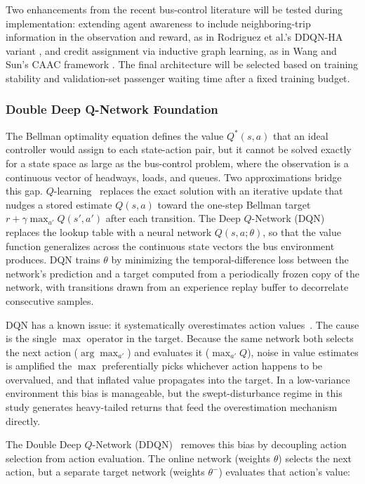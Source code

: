 Two enhancements from the recent bus-control literature will be tested during implementation: extending agent awareness to include neighboring-trip information in the observation and reward, as in Rodriguez et al.'s DDQN-HA variant \cite{Rodriguez2023Cooperative}, and credit assignment via inductive graph learning, as in Wang and Sun's CAAC framework \cite{Wangsun}. The final architecture will be selected based on training stability and validation-set passenger waiting time after a fixed training budget.


\subsubsection{Double Deep Q-Network Foundation}
\label{subsec:ddqn-foundation}

The Bellman optimality equation defines the value $Q^*(s,a)$ that an ideal controller would assign to each state-action pair, but it cannot be solved exactly for a state space as large as the bus-control problem, where the observation is a continuous vector of headways, loads, and queues. Two approximations bridge this gap. $Q$-learning~\cite{Bellman1957,Littman1994} replaces the exact solution with an iterative update that nudges a stored estimate $Q(s,a)$ toward the one-step Bellman target $r + \gamma \max_{a'} Q(s',a')$ after each transition. The Deep $Q$-Network (DQN)~\cite{Mnih2015DQN} replaces the lookup table with a neural network $Q(s,a;\theta)$, so that the value function generalizes across the continuous state vectors the bus environment produces. DQN trains $\theta$ by minimizing the temporal-difference loss between the network's prediction and a target computed from a periodically frozen copy of the network, with transitions drawn from an experience replay buffer to decorrelate consecutive samples.

DQN has a known issue: it systematically overestimates action values~\cite{vanHasselt2016DDQN}. The cause is the single $\max$ operator in the target. Because the same network both selects the next action ($\arg\max_{a'}$) and evaluates it ($\max_{a'} Q$), noise in value estimates is amplified the $\max$ preferentially picks whichever action happens to be overvalued, and that inflated value propagates into the target. In a low-variance environment this bias is manageable, but the swept-disturbance regime in this study generates heavy-tailed returns that feed the overestimation mechanism directly.

The Double Deep $Q$-Network (DDQN)~\cite{vanHasselt2016DDQN} removes this bias by decoupling action selection from action evaluation. The online network (weights $\theta$) selects the next action, but a separate target network (weights $\theta^-$) evaluates that action's value:

